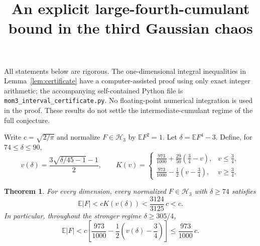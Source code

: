 \documentclass[11pt]{article}
\title{An explicit large-fourth-cumulant bound in the third Gaussian chaos}
\author{}
\date{}
\newtheorem{theorem}{Theorem}
\newcommand{\E}{\mathbb E}
\begin{document}
\maketitle

All statements below are rigorous. The one-dimensional integral inequalities
in Lemma~\ref{lem:certificate} have a computer-assisted proof using only exact
integer arithmetic; the accompanying self-contained Python file is
\texttt{mom3\_interval\_certificate.py}. No floating-point numerical integration
is used in the proof. These results do not settle the intermediate-cumulant
regime of the full conjecture.

Write $c=\sqrt{2/\pi}$ and normalize $F\in\mathcal H_3$ by $\E F^2=1$.
Let $\delta=\E F^4-3$. Define, for $74\leq\delta\leq90$,
\[
 v(\delta)=\frac{3\sqrt{\delta/45-1}-1}{2},
 \qquad
 K(v)=
 \begin{cases}
 \displaystyle\frac{973}{1000}+\frac{29}{50}\left(\frac34-v\right),
       &v\leq\frac34,\\[4pt]
 \displaystyle\frac{973}{1000}-\frac12\left(v-\frac34\right),
       &v\geq\frac34.
 \end{cases}
\]

\begin{theorem}\label{thm:main}
For every dimension, every normalized $F\in\mathcal H_3$ with $\delta\geq74$
satisfies
\[
 \E|F|<cK(v(\delta))<\frac{3124}{3125}\,c<c.
\]
In particular, throughout the stronger regime $\delta\geq305/4$,
\[
 \E|F|<c\left[\frac{973}{1000}
       -\frac12\left(v(\delta)-\frac34\right)\right]
 \leq\frac{973}{1000}\,c.
\]
\end{theorem}
\end{document}
